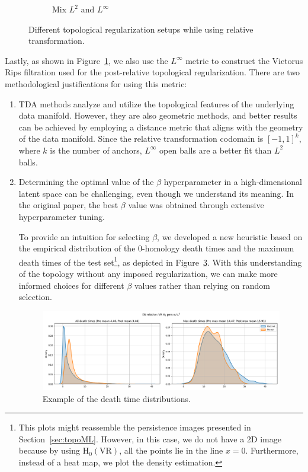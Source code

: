 \documentclass[../main.tex]{subfiles}
\begin{document}
\begin{figure}[ht!]
\begin{subfigure}[b]{0.45\textwidth}
        \caption{Mix $L^2$ and $L^\infty$}
         \label{fig:relativeTopoMixScheme}
     \end{subfigure}
    \caption{Different topological regularization setups while using relative transformation.}
    \label{fig:topoSetups}
\end{figure}


Lastly, as shown in Figure~\ref{fig:relativeTopoMixScheme}, we also use the $L^\infty$ metric to construct the Vietorus Rips filtration used for the post-relative topological regularization. There are two methodological justifications for using this metric:
\begin{enumerate}
    \item TDA methods analyze and utilize the topological features of the underlying data manifold. However, they are also geometric methods, and better results can be achieved by employing a distance metric that aligns with the geometry of the data manifold. Since the relative transformation codomain is $[-1, 1]^k$, where $k$ is the number of anchors, $L^\infty$ open balls are a better fit than $L^2$ balls.

    \item Determining the optimal value of the $\beta$ hyperparameter in a high-dimensional latent space can be challenging, even though we understand its meaning. In the original paper, the best $\beta$ value was obtained through extensive hyperparameter tuning.

    To provide an intuition for selecting $\beta$, we developed a new heuristic based on the empirical distribution of the 0-homology death times and the maximum death times of the test set\footnote{This plots might reassemble the persistence images presented in Section~\ref{sec:topoML}. However, in this case, we do not have a 2D image because by using $\text{H}_0(\text{VR})$, all the points lie in the line $x=0$. Furthermore, instead of a heat map, we plot the density estimation.}, as depicted in Figure~\ref{fig:h0Ex}. With this understanding of the topology without any imposed regularization, we can make more informed choices for different $\beta$ values rather than relying on random selection.

    \begin{figure}[!ht]
        \centering
        \includegraphics[width=\textwidth]{figures/mt/en_relative_seed0.png} 
        \caption{Example of the death time distributions.}
        \label{fig:h0Ex}
    \end{figure}


\end{enumerate}
\end{document}
